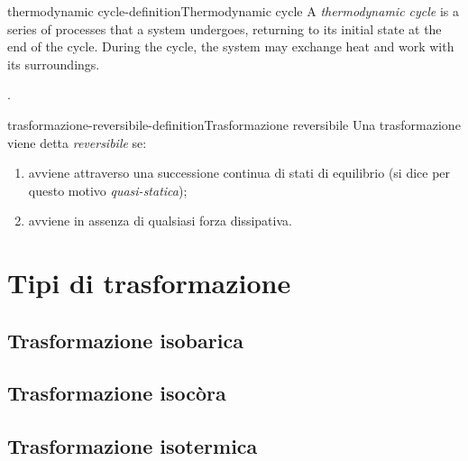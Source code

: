 \documentclass[preview]{standalone}
\begin{document}
\begin{snippetdefinition}{thermodynamic cycle-definition}{Thermodynamic cycle}
    A \emph{thermodynamic cycle} is a series of processes that a system undergoes,
    returning to its initial state at the end of the cycle.
    During the cycle, the system may exchange heat and work with its surroundings.
\end{snippetdefinition}


.

\begin{snippetdefinition}{trasformazione-reversibile-definition}{Trasformazione reversibile}
    Una trasformazione viene detta \emph{reversibile} se:
    \begin{enumerate}
        \item avviene attraverso una successione
        continua di stati di equilibrio (si dice per questo motivo \emph{quasi-statica});
        \item avviene in assenza di qualsiasi forza dissipativa.
    \end{enumerate}
\end{snippetdefinition}

\section{Tipi di trasformazione}

\subsection{Trasformazione isobarica}


\subsection{Trasformazione isocòra}


\subsection{Trasformazione isotermica}

\end{document}
